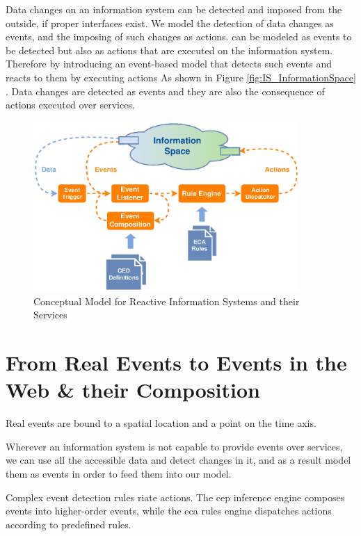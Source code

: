 Data changes on an information system can be detected and imposed from the outside, if proper interfaces exist.
We model the detection of data changes as events, and the imposing of such changes as actions.
 can be modeled as events to be detected but also as actions that are executed on the information system.
Therefore by introducing an event-based model that detects such events and reacts to them by executing actions 
As shown in Figure \ref{fig:IS_InformationSpace}
. Data changes are detected as events and they are also the consequence of actions executed over services.

\begin{figure}[!ht]
  \centering
  \includegraphics[width=0.9\textwidth]{figures/Standard-Model-Template}
  \caption{Conceptual Model for Reactive Information Systems and their Services}
  \label{fig:Standard-Model-Template}
\end{figure}

\section{From Real Events to Events in the Web \& their Composition}
Real events are bound to a spatial location and a point on the time axis.

Wherever an information system is not capable to provide events over services, we can use all the accessible data and detect changes in it, and as a result model them as events in order to feed them into our model.


Complex event detection rules \cite{akdere2008plan}\cite{2004_1265833}
riate actions.
The \textrm{\acrshort{cep}} inference engine composes events into higher-order events, while the \textrm{\acrshort{eca}} rules engine dispatches actions according to predefined rules.

